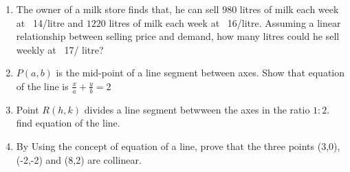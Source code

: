 \begin{enumerate}
\item The owner of a milk store finds that, he can sell $980$ litres of milk each week at \rupee~14/litre and $1220$ litres of milk each week at \rupee~16/litre. Assuming a linear relationship between selling price and demand, how many litres could he sell weekly at \rupee~17/ litre?
\item $P(a,b)$ is the mid-point of a line segment between axes. Show that equation of the line is $\frac{x}{a}+\frac{y}{b}=2$
\item Point $R(h,k)$ divides a line segment betwween the axes in the ratio $1:2$. find equation of the line.
\item By Using the concept of equation of a line, prove that the three points (3,0), (-2,-2) and (8,2) are collinear.
\end{enumerate}

